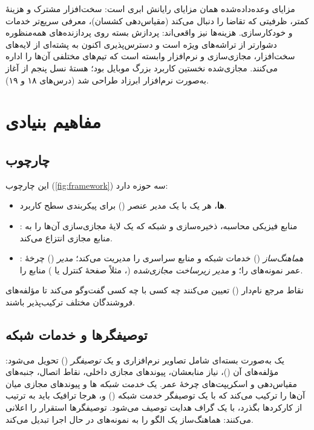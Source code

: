 \documentclass[11pt,a4paper]{article}
\begin{document}
مزایای وعده‌داده‌شده همان مزایای رایانش ابری است: سخت‌افزار مشترک و هزینهٔ کمتر، ظرفیتی که تقاضا را دنبال می‌کند (مقیاس‌دهی
کشسان)، معرفی سریع‌تر خدمات و خودکارسازی. هزینه‌ها نیز واقعی‌اند: پردازش بسته روی پردازنده‌های همه‌منظوره دشوارتر از
تراشه‌های ویژه است و دسترس‌پذیری اکنون به پشته‌ای از لایه‌های سخت‌افزار، مجازی‌سازی و نرم‌افزار وابسته است که تیم‌های
مختلفی آن‌ها را اداره می‌کنند.  مجازی‌شده نخستین کاربرد بزرگ موبایل بود؛ هستهٔ نسل پنجم از آغاز به‌صورت
نرم‌افزار ابرزاد طراحی شد (درس‌های ۱۸ و ۱۹).

\section{مفاهیم بنیادی}

\subsection{چارچوب }
این چارچوب (\cref{fig:framework}) \cite{etsinfv002} سه حوزه دارد:
\begin{itemize}
  \item \textbf{ها}، هر یک با یک مدیر عنصر () برای پیکربندی سطح کاربرد.
  \item \textbf{}: منابع فیزیکی محاسبه، ذخیره‌سازی و شبکه که یک لایهٔ مجازی‌سازی آن‌ها را به منابع مجازی انتزاع
        می‌کند.
  \item \textbf{} \cite{etsinfvman001}: \emph{هماهنگ‌ساز } () خدمات شبکه و منابع سراسری را
        مدیریت می‌کند؛ \emph{مدیر } () چرخهٔ عمر نمونه‌های  را؛ و \emph{مدیر زیرساخت مجازی‌شده}
        (، مثلاً صفحهٔ کنترل  یا ) منابع  را.
\end{itemize}
نقاط مرجع نام‌دار () تعیین می‌کنند چه کسی با چه کسی
گفت‌وگو می‌کند تا مؤلفه‌های فروشندگان مختلف ترکیب‌پذیر باشند.

\begin{acnfigure}
  \caption{چارچوب معماری  با نقاط مرجع اصلی آن \cite{etsinfv002}.}
  \label{fig:framework}
\end{acnfigure}

\subsection{توصیفگرها و خدمات شبکه}
یک  به‌صورت بسته‌ای شامل تصاویر نرم‌افزاری و یک \emph{توصیفگر } () تحویل می‌شود: مؤلفه‌های
آن ()، نیاز منابعشان، پیوندهای مجازی داخلی، نقاط اتصال، جنبه‌های مقیاس‌دهی و اسکریپت‌های چرخهٔ عمر. یک \emph{خدمت
شبکه} ها و پیوندهای مجازی میان آن‌ها را ترکیب می‌کند که با یک توصیفگر خدمت شبکه () و، هرجا ترافیک باید
به ترتیب از کارکردها بگذرد، با یک گراف هدایت توصیف می‌شود. توصیفگرها استقرار را اعلانی می‌کنند: هماهنگ‌ساز یک الگو را به
نمونه‌های در حال اجرا تبدیل می‌کند.
\end{document}
